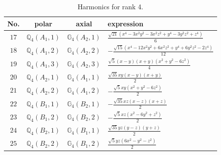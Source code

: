 \documentclass[fleqn,8pt,landscape]{jsarticle}
\begin{document}
\begin{table}[ht!]
\begin{center}
\caption{Harmonics for rank 4.}
\renewcommand{\arraystretch}{1.3}
\begin{tabular}{cccl} \hline \hline
No. & polar & axial & expression \\ \hline
$ 17 $ & $ \mathbb{Q}_{4}(A_{1},1) $ & $ \mathbb{G}_{4}(A_{2},1) $ & $ \frac{\sqrt{21} \left(x^{4} - 3 x^{2} y^{2} - 3 x^{2} z^{2} + y^{4} - 3 y^{2} z^{2} + z^{4}\right)}{6} $ \\
$ 18 $ & $ \mathbb{Q}_{4}(A_{1},2) $ & $ \mathbb{G}_{4}(A_{2},2) $ & $ - \frac{\sqrt{15} \left(x^{4} - 12 x^{2} y^{2} + 6 x^{2} z^{2} + y^{4} + 6 y^{2} z^{2} - 2 z^{4}\right)}{12} $ \\
$ 19 $ & $ \mathbb{Q}_{4}(A_{1},3) $ & $ \mathbb{G}_{4}(A_{2},3) $ & $ \frac{\sqrt{5} \left(x - y\right) \left(x + y\right) \left(x^{2} + y^{2} - 6 z^{2}\right)}{4} $ \\
$ 20 $ & $ \mathbb{Q}_{4}(A_{2},1) $ & $ \mathbb{G}_{4}(A_{1},1) $ & $ \frac{\sqrt{35} x y \left(x - y\right) \left(x + y\right)}{2} $ \\
$ 21 $ & $ \mathbb{Q}_{4}(A_{2},2) $ & $ \mathbb{G}_{4}(A_{1},2) $ & $ - \frac{\sqrt{5} x y \left(x^{2} + y^{2} - 6 z^{2}\right)}{2} $ \\
$ 22 $ & $ \mathbb{Q}_{4}(B_{1},1) $ & $ \mathbb{G}_{4}(B_{2},1) $ & $ - \frac{\sqrt{35} x z \left(x - z\right) \left(x + z\right)}{2} $ \\
$ 23 $ & $ \mathbb{Q}_{4}(B_{1},2) $ & $ \mathbb{G}_{4}(B_{2},2) $ & $ - \frac{\sqrt{5} x z \left(x^{2} - 6 y^{2} + z^{2}\right)}{2} $ \\
$ 24 $ & $ \mathbb{Q}_{4}(B_{2},1) $ & $ \mathbb{G}_{4}(B_{1},1) $ & $ \frac{\sqrt{35} y z \left(y - z\right) \left(y + z\right)}{2} $ \\
$ 25 $ & $ \mathbb{Q}_{4}(B_{2},2) $ & $ \mathbb{G}_{4}(B_{1},2) $ & $ \frac{\sqrt{5} y z \left(6 x^{2} - y^{2} - z^{2}\right)}{2} $ \\
 \hline \hline
\end{tabular}
\end{center}
\end{table}
\end{document}

